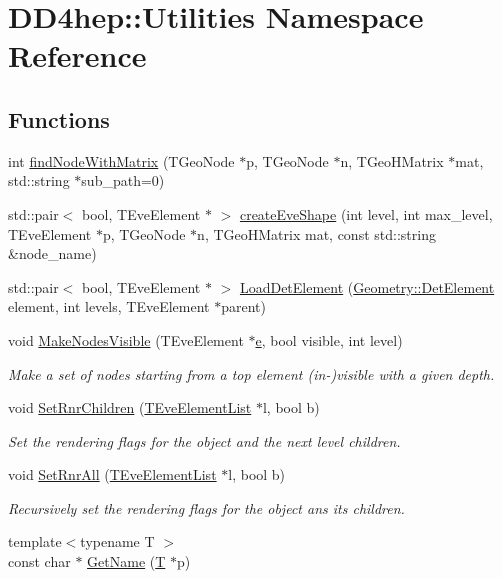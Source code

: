 \hypertarget{namespace_d_d4hep_1_1_utilities}{}\section{D\+D4hep\+:\+:Utilities Namespace Reference}
\label{namespace_d_d4hep_1_1_utilities}
\subsection*{Functions}
\begin{DoxyCompactItemize}
\item 
int \hyperlink{namespace_d_d4hep_1_1_utilities_a61171c4258ed951d93ba11763da066fc}{find\+Node\+With\+Matrix} (T\+Geo\+Node $\ast$p, T\+Geo\+Node $\ast$n, T\+Geo\+H\+Matrix $\ast$mat, std\+::string $\ast$sub\+\_\+path=0)
\item 
std\+::pair$<$ bool, T\+Eve\+Element $\ast$ $>$ \hyperlink{namespace_d_d4hep_1_1_utilities_aa469540c9b22f32d6ac947c4fbe7a7dc}{create\+Eve\+Shape} (int level, int max\+\_\+level, T\+Eve\+Element $\ast$p, T\+Geo\+Node $\ast$n, T\+Geo\+H\+Matrix mat, const std\+::string \&node\+\_\+name)
\item 
std\+::pair$<$ bool, T\+Eve\+Element $\ast$ $>$ \hyperlink{namespace_d_d4hep_1_1_utilities_a8f334a7b469c25f5315745d8dceb0fa7}{Load\+Det\+Element} (\hyperlink{class_d_d4hep_1_1_geometry_1_1_det_element}{Geometry\+::\+Det\+Element} element, int levels, T\+Eve\+Element $\ast$parent)
\item 
void \hyperlink{namespace_d_d4hep_1_1_utilities_a93a4f08ad1e94bdda79153a858ab809b}{Make\+Nodes\+Visible} (T\+Eve\+Element $\ast$\hyperlink{_volumes_8cpp_a8a9a1f93e9b09afccaec215310e64142}{e}, bool visible, int level)
\begin{DoxyCompactList}\small\item\em Make a set of nodes starting from a top element (in-\/)visible with a given depth. \end{DoxyCompactList}\item 
void \hyperlink{namespace_d_d4hep_1_1_utilities_a39b86ff9be41d39a9569a9a45c9484c2}{Set\+Rnr\+Children} (\hyperlink{class_t_eve_element_list}{T\+Eve\+Element\+List} $\ast$l, bool b)
\begin{DoxyCompactList}\small\item\em Set the rendering flags for the object and the next level children. \end{DoxyCompactList}\item 
void \hyperlink{namespace_d_d4hep_1_1_utilities_a92896bc98df5b92fe16f7cfc74716442}{Set\+Rnr\+All} (\hyperlink{class_t_eve_element_list}{T\+Eve\+Element\+List} $\ast$l, bool b)
\begin{DoxyCompactList}\small\item\em Recursively set the rendering flags for the object ans its children. \end{DoxyCompactList}\item 
{\footnotesize template$<$typename T $>$ }\\const char $\ast$ \hyperlink{namespace_d_d4hep_1_1_utilities_a4c0a9b81fbdf72442aa513ab684f4243}{Get\+Name} (\hyperlink{class_t}{T} $\ast$p)
\end{DoxyCompactItemize}


